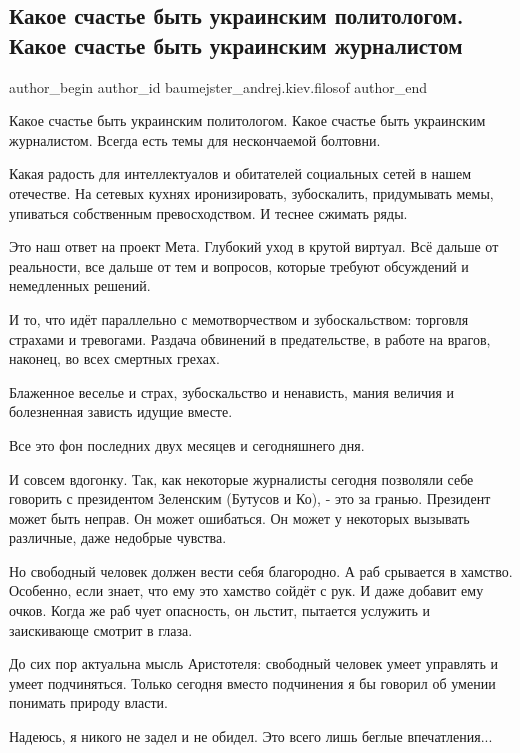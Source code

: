  
 
 
 
 
 
\subsection{Какое счастье быть украинским политологом. Какое счастье быть украинским журналистом}
\label{sec:26_11_2021.fb.baumejster_andrej.kiev.filosof.1.schastje_zhurnalist_politolog}
 
\ifcmt
 author_begin
   author_id baumejster_andrej.kiev.filosof
 author_end
\fi

Какое счастье быть украинским политологом. Какое счастье быть украинским
журналистом. Всегда есть темы для нескончаемой болтовни. 

Какая радость для интеллектуалов и обитателей социальных сетей в нашем
отечестве. На сетевых кухнях иронизировать, зубоскалить, придумывать мемы,
упиваться собственным превосходством. И теснее сжимать ряды. 

Это наш ответ на проект Мета. Глубокий уход в крутой виртуал. Всё дальше от
реальности, все дальше от тем и вопросов, которые требуют обсуждений и
немедленных решений.

И то, что идёт параллельно с мемотворчеством и зубоскальством: торговля
страхами и тревогами. Раздача обвинений в предательстве, в работе на врагов,
наконец, во всех смертных грехах.

Блаженное веселье и страх, зубоскальство и ненависть, мания величия и
болезненная зависть идущие вместе. 

Все это фон последних двух месяцев и сегодняшнего дня.

И совсем вдогонку. Так, как некоторые журналисты сегодня позволяли себе
говорить с президентом Зеленским (Бутусов и Ко), - это за гранью. Президент
может быть неправ. Он может ошибаться. Он может у некоторых вызывать различные,
даже недобрые чувства.

Но свободный человек должен вести себя благородно. А раб срывается в хамство.
Особенно, если знает, что ему это хамство сойдёт с рук. И даже добавит ему
очков. Когда же раб чует опасность, он льстит, пытается услужить и заискивающе
смотрит в глаза.

До сих пор актуальна мысль Аристотеля: свободный человек умеет управлять и
умеет подчиняться. Только сегодня вместо подчинения я бы говорил об умении
понимать природу власти.

Надеюсь, я никого не задел и не обидел. Это всего лишь беглые впечатления...

